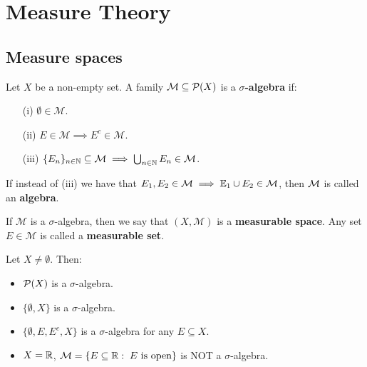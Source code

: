 \chapter{Measure Theory}

\section{Measure spaces}

\begin{fdefinition}
    Let $X$ be a non-empty set. A family $\mathcal{M} \subseteq \mathcal{P}(X)$ is a
    \textbf{$\sigma$-algebra} if:

    \vspace{1em}

    \begin{enumerate}
        \item[(i)] $\emptyset \in \mathcal{M}$.
        \vspace{1em}
        \item[(ii)] $E \in \mathcal{M} \implies E^c \in \mathcal{M}$.
        \vspace{1em}
        \item[(iii)] $\{E_n\}_{n \in \mathbb{N}} \subseteq \mathcal{M} \implies \bigcup_{n \in \mathbb{N}} E_n \in \mathcal{M}$.
    \end{enumerate}

    \vspace{1em}

    If instead of (iii) we have that $E_1, E_2 \in \mathcal{M} \implies \mathbb{E}_1 \cup E_2 \in \mathcal{M}$, then
    $\mathcal{M}$ is called an \textbf{algebra}.

\end{fdefinition}

\begin{fremark}
    If $\mathcal{M}$ is a $\sigma$-algebra, then we say that $(X, \mathcal{M})$ is a
    \textbf{measurable space}. Any set $E \in \mathcal{M}$ is called a
    \textbf{measurable set}.
\end{fremark}

\begin{example}
    Let $X \neq \emptyset$. Then:

    \begin{itemize}
        \item $\mathcal{P}(X)$ is a $\sigma$-algebra.
        \item $\{\emptyset, X\}$ is a $\sigma$-algebra.
        \item $\{\emptyset, E, E^c, X\}$ is a $\sigma$-algebra for any $E \subseteq X$.
        \item $X = \mathbb{R}$, $\mathcal{M} = \{E \subseteq \mathbb{R}: \; E \text{ is open}\}$ is NOT a $\sigma$-algebra.
    \end{itemize}
\end{example}

